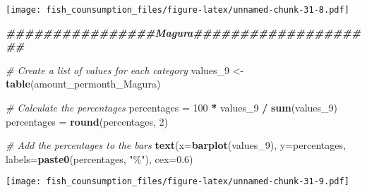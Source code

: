 \documentclass[
]{article}
\newenvironment{Shaded}{\begin{snugshade}}{\end{snugshade}}
\newcommand{\AttributeTok}[1]{\textcolor[rgb]{0.13,0.29,0.53}{#1}}
\newcommand{\CommentTok}[1]{\textcolor[rgb]{0.56,0.35,0.01}{\textit{#1}}}
\newcommand{\DecValTok}[1]{\textcolor[rgb]{0.00,0.00,0.81}{#1}}
\newcommand{\DocumentationTok}[1]{\textcolor[rgb]{0.56,0.35,0.01}{\textbf{\textit{#1}}}}
\newcommand{\FloatTok}[1]{\textcolor[rgb]{0.00,0.00,0.81}{#1}}
\newcommand{\FunctionTok}[1]{\textcolor[rgb]{0.13,0.29,0.53}{\textbf{#1}}}
\newcommand{\NormalTok}[1]{#1}
\newcommand{\OtherTok}[1]{\textcolor[rgb]{0.56,0.35,0.01}{#1}}
\newcommand{\SpecialCharTok}[1]{\textcolor[rgb]{0.81,0.36,0.00}{\textbf{#1}}}
\newcommand{\StringTok}[1]{\textcolor[rgb]{0.31,0.60,0.02}{#1}}
\begin{document}
\texttt{[image: fish\_counsumption\_files/figure-latex/unnamed-chunk-31-8.pdf]}

\begin{Shaded}
\begin{Highlighting}[]
\DocumentationTok{\#\#\#\#\#\#\#\#\#\#\#\#\#\#\#\#Magura\#\#\#\#\#\#\#\#\#\#\#\#\#\#\#\#\#\#\#\#}

\CommentTok{\# Create a list of values for each category}
\NormalTok{values\_9 }\OtherTok{\textless{}{-}} \FunctionTok{table}\NormalTok{(amount\_permonth\_Magura)}

\CommentTok{\# Calculate the percentages}
\NormalTok{percentages }\OtherTok{=} \DecValTok{100} \SpecialCharTok{*}\NormalTok{ values\_9 }\SpecialCharTok{/} \FunctionTok{sum}\NormalTok{(values\_9)}
\NormalTok{percentages }\OtherTok{=} \FunctionTok{round}\NormalTok{(percentages, }\DecValTok{2}\NormalTok{)}

\CommentTok{\# Add the percentages to the bars}
\FunctionTok{text}\NormalTok{(}\AttributeTok{x=}\FunctionTok{barplot}\NormalTok{(values\_9), }\AttributeTok{y=}\NormalTok{percentages, }\AttributeTok{labels=}\FunctionTok{paste0}\NormalTok{(percentages, }\StringTok{"\%"}\NormalTok{), }\AttributeTok{cex=}\FloatTok{0.6}\NormalTok{)}
\end{Highlighting}
\end{Shaded}

\texttt{[image: fish\_counsumption\_files/figure-latex/unnamed-chunk-31-9.pdf]}
\end{document}
